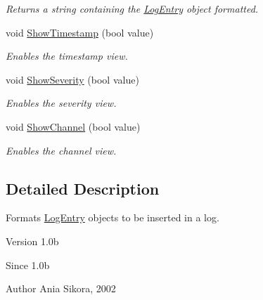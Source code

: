 \begin{DoxyCompactItemize}
\begin{DoxyCompactList}\small\item\em Returns a string containing the \hyperlink{class_common_1_1_log_entry}{Log\-Entry} object formatted. \end{DoxyCompactList}\item 
\hypertarget{class_common_1_1_basic_log_formatter_a172fd032eda1aeeab28e41e05e3beea4}{void \hyperlink{class_common_1_1_basic_log_formatter_a172fd032eda1aeeab28e41e05e3beea4}{Show\-Timestamp} (bool value)}\label{class_common_1_1_basic_log_formatter_a172fd032eda1aeeab28e41e05e3beea4}

\begin{DoxyCompactList}\small\item\em Enables the timestamp view. \end{DoxyCompactList}\item 
\hypertarget{class_common_1_1_basic_log_formatter_aa6d2d80418ac6335050ee02bdf13f437}{void \hyperlink{class_common_1_1_basic_log_formatter_aa6d2d80418ac6335050ee02bdf13f437}{Show\-Severity} (bool value)}\label{class_common_1_1_basic_log_formatter_aa6d2d80418ac6335050ee02bdf13f437}

\begin{DoxyCompactList}\small\item\em Enables the severity view. \end{DoxyCompactList}\item 
\hypertarget{class_common_1_1_basic_log_formatter_a209956bbe8d7fba142adecb0208c1093}{void \hyperlink{class_common_1_1_basic_log_formatter_a209956bbe8d7fba142adecb0208c1093}{Show\-Channel} (bool value)}\label{class_common_1_1_basic_log_formatter_a209956bbe8d7fba142adecb0208c1093}

\begin{DoxyCompactList}\small\item\em Enables the channel view. \end{DoxyCompactList}\end{DoxyCompactItemize}


\subsection{Detailed Description}
Formats \hyperlink{class_common_1_1_log_entry}{Log\-Entry} objects to be inserted in a log. 

\begin{DoxyVersion}{Version}
1.\-0b 
\end{DoxyVersion}
\begin{DoxySince}{Since}
1.\-0b 
\end{DoxySince}
\begin{DoxyAuthor}{Author}
Ania Sikora, 2002 
\end{DoxyAuthor}


